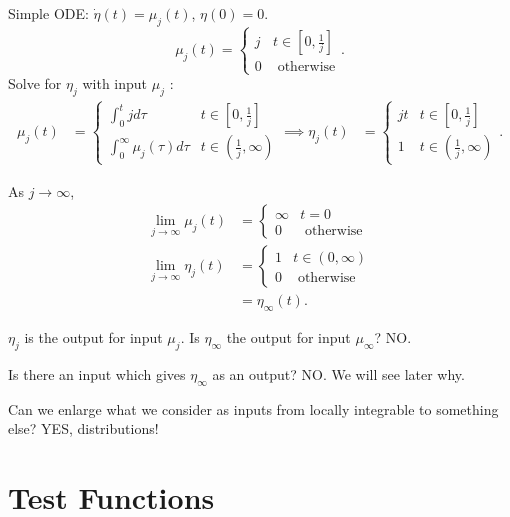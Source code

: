 \begin{example}
	Simple ODE: $\dot{\eta} \left( t \right)  = \mu_{j}\left( t \right) $, $\eta\left( 0 \right)  = 0$.
	\[
		\mu_{j}\left( t \right) = \begin{cases}
			j & t \in  \left[ 0, \frac{1}{j} \right] \\
			0 & \text{ otherwise}
		\end{cases}
	.\] 
	Solve for $\eta_{j}$ with input $\mu_{j}$ :
	\begin{align*}
		\mu_{j}\left( t \right) &= \begin{cases}
			\int_{0}^{t} jd\tau & t \in \left[ 0, \frac{1}{j} \right]  \\
			\int_{0}^{\infty} \mu_{j}\left( \tau \right) d\tau & t \in \left( \frac{1}{j}, \infty \right) 
		\end{cases}
		\implies \eta_{j}\left( t \right) &= \begin{cases}
			jt & t \in  \left[ 0,\frac{1}{j} \right]  \\
			1 & t \in \left( \frac{1}{j}, \infty \right) 
		\end{cases}
	.\end{align*}

	As $j \to  \infty$,
	\begin{align*}
		\lim_{j \to \infty} \mu_{j}\left( t \right) &= \begin{cases}
			\infty & t = 0\\
			0 & \text{ otherwise}
		\end{cases} \\
		\lim_{j \to \infty} \eta_{j} \left( t \right) &= \begin{cases}
			1 & t \in  \left( 0, \infty \right) \\
			0 & \text{ otherwise}
		\end{cases} \\
			&= \eta_{\infty}\left( t \right) 
	.\end{align*}
\end{example}
 
$\eta_{j}$ is the output for input $\mu_{j}$. Is $\eta_{\infty}$ the output for input $\mu_{\infty}$? NO.

Is there an input which gives $\eta_{\infty}$ as an output? NO. We will see later why. 

Can we enlarge what we consider as inputs from locally integrable to something else? YES, distributions!

\section{Test Functions}

